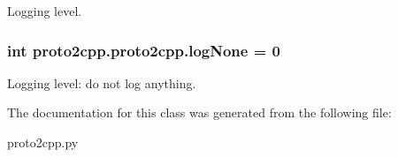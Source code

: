 Logging level. 

\subsubsection[{\texorpdfstring{log\+None}{logNone}}]{\setlength{\rightskip}{0pt plus 5cm}int proto2cpp.\+proto2cpp.\+log\+None = 0\hspace{0.3cm}{\ttfamily [static]}}\hypertarget{classproto2cpp_1_1proto2cpp_a85f1be79a05376f69b9a75c28ebdd29c}{}\label{classproto2cpp_1_1proto2cpp_a85f1be79a05376f69b9a75c28ebdd29c}


Logging level\+: do not log anything. 



The documentation for this class was generated from the following file\+:\begin{DoxyCompactItemize}
\item 
proto2cpp.\+py\end{DoxyCompactItemize}
